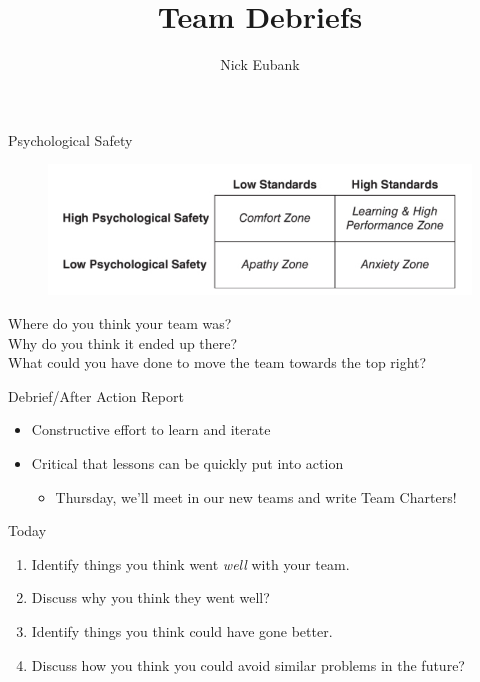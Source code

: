 \documentclass[11pt]{beamer}
\title{Team Debriefs}
\author{\small Nick Eubank}
\date{\vspace*{.3in} \date}
\begin{document}
\begin{frame}[c]
\maketitle
\end{frame}

\begin{frame}[c]{Psychological Safety}
\begin{figure}
    \includegraphics[width=\textwidth]{team_types.png}
\end{figure}
\pause Where do you think your team was? \\
Why do you think it ended up there? \\
What could you have done to move the team towards the top right?
\end{frame}


\begin{frame}[c]{Debrief/After Action Report}
    \begin{itemize}
        \item Constructive effort to learn and iterate
        \item Critical that lessons can be quickly put into action
        \begin{itemize}
            \item Thursday, we'll meet in our new teams and write Team Charters!
        \end{itemize}
    \end{itemize}
\end{frame}

\begin{frame}[c]{Today}
\begin{enumerate}
    \item Identify things you think went \emph{well} with your team. 
    \item Discuss \alert{why} you think they went well?
    \item Identify things you think could have gone better.
    \item Discuss \alert{how} you think you could avoid similar problems in the future?
\end{enumerate}
\end{frame}
\end{document}
